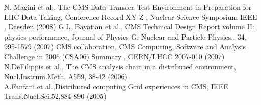 \begin{thebibliography}{}
%
 N. Magini et al., The CMS Data Transfer Test Environment in Preparation for LHC Data Taking, Conference Record XY-Z , Nuclear Science Symposium IEEE , Dresden (2008)
%
 G.L. Bayatian et al., CMS Technical Design Report volume II: physics performance, Journal of Physics G: Nuclear and Particle Physics., 34, 995-1579 (2007)
%
CMS collaboration,  CMS Computing, Software and Analysis Challenge in 2006 (CSA06) Summary , %
CERN/LHCC 2007-010 (2007) \\
N.DeFilippis et al., The CMS analysis chain in a distributed environment, Nucl.Instrum.Meth. A559, 38-42 (2006) \\
A.Fanfani et al.,Distributed computing Grid experiences in CMS, IEEE Trans.Nucl.Sci.52,884-890 (2005)
\end{thebibliography}



